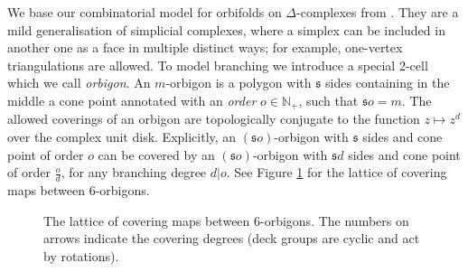 \documentclass{amsart}
\begin{document}
\medskip

We base our combinatorial model for orbifolds on $\Delta$-complexes from \cite[\S 2.1]{alg_top_Hatcher02}. They are a mild generalisation of simplicial complexes, where a simplex can be included in another one as a face in multiple distinct ways; for example, one-vertex triangulations are allowed. To model branching we introduce a special 2-cell which we call \emph{orbigon}. An $m$-orbigon is a polygon with $\mathfrak{s}$ sides containing in the middle a cone point annotated with an \emph{order} $o\in\mathbb{N}_+$, such that $\mathfrak{s}o=m$. The allowed coverings of an orbigon are topologically conjugate to the function $z\mapsto z^d$ over the complex unit disk. Explicitly, an $(\mathfrak{s}o)$-orbigon with $\mathfrak{s}$ sides and cone point of order $o$ can be covered by an $(\mathfrak{s}o)$-orbigon with $\mathfrak{s}d$ sides and cone point of order $\tfrac{o}{d}$, for any branching degree $d|o$. See Figure \ref{fig:orbigon_coverings} for the lattice of covering maps between 6-orbigons.

\begin{figure}[h]
\centering
{}
\caption{The lattice of covering maps between 6-orbigons. The numbers on arrows indicate the covering degrees (deck groups are cyclic and act by rotations).}
\label{fig:orbigon_coverings}
\end{figure}
\end{document}
